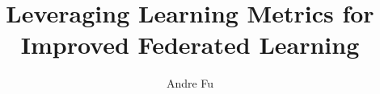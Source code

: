 \documentclass[
  equalmargins,
  12pt,
  openany,
  onehalfspacing,
]{ut-thesis}
\author{Andre Fu}
\title{Leveraging Learning Metrics for Improved Federated Learning}
\theoremstyle{remark}
\begin{document}
  \frontmatter
    \maketitle
    \begin{abstract}
      
    \end{abstract}
    \tableofcontents
    \listoffigures
  \mainmatter
    
    
    
    
    
  \appendix
    
  \backmatter
  \printbibliography[heading=bibintoc]
\end{document}
